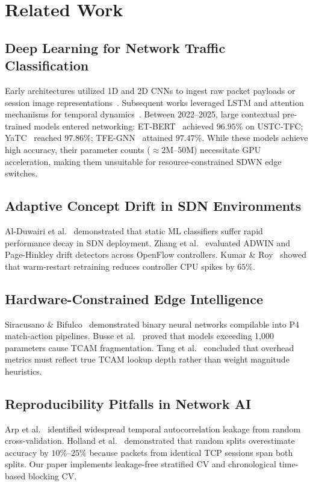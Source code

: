 \documentclass[journal]{IEEEtran}
\begin{document}
\section{Related Work}
\label{sec:related}

\subsection{Deep Learning for Network Traffic Classification}
Early architectures utilized 1D and 2D CNNs to ingest raw packet payloads or
session image representations~\cite{wang2017,shapira2021}. Subsequent works
leveraged LSTM and attention mechanisms for temporal dynamics~\cite{liu2019}.
Between 2022--2025, large contextual pre-trained models entered networking:
ET-BERT~\cite{lin2022} achieved $96.95\%$ on USTC-TFC; YaTC~\cite{chen2023}
reached $97.86\%$; TFE-GNN~\cite{shen2023} attained $97.47\%$. While these
models achieve high accuracy, their parameter counts
(${\approx}2\text{M}$--$50\text{M}$) necessitate GPU acceleration, making
them unsuitable for resource-constrained SDWN edge switches.

\subsection{Adaptive Concept Drift in SDN Environments}
Al-Duwairi et al.~\cite{alduwairi2024} demonstrated that static ML classifiers
suffer rapid performance decay in SDN deployment. Zhang et al.~\cite{zhang2025}
evaluated ADWIN and Page-Hinkley drift detectors across OpenFlow controllers.
Kumar \& Roy~\cite{kumar2024} showed that warm-restart retraining reduces
controller CPU spikes by $65\%$.

\subsection{Hardware-Constrained Edge Intelligence}
Siracusano \& Bifulco~\cite{siracusano2022} demonstrated binary neural networks
compilable into P4 match-action pipelines. Busse et al.~\cite{busse2024}
proved that models exceeding 1,000 parameters cause TCAM fragmentation.
Tang et al.~\cite{tang2025} concluded that overhead metrics must reflect true
TCAM lookup depth rather than weight magnitude heuristics.

\subsection{Reproducibility Pitfalls in Network AI}
Arp et al.~\cite{arp2022} identified widespread temporal autocorrelation
leakage from random cross-validation. Holland et al.~\cite{holland2024}
demonstrated that random splits overestimate accuracy by $10\%$--$25\%$
because packets from identical TCP sessions span both splits. Our paper
implements leakage-free stratified CV and chronological time-based blocking CV.
\end{document}
